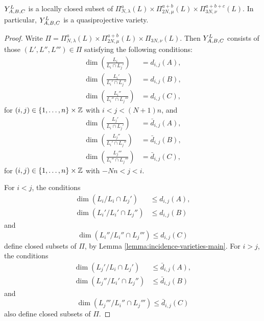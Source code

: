 \documentclass[a4paper, 11pt]{report}
\begin{document}
\begin{lemma}\label{lemma:y-triple-is-quasiprojective}
$\yprod[L]{A,B,C}$ is a locally closed subset of $\Pi_{N,\lambda}^a(L)\times\Pi_{2N,\mu}^{a+b}(L)\times\Pi_{3N,\nu}^{a+b+c}(L)$. In particular, $\yprod[L]{A,B,C}$ is a quasiprojective variety.
\end{lemma}

\begin{proof}
Write $\Pi=\Pi_{N,\lambda}^a(L)\times\Pi_{2N,\mu}^{a+b}(L)\times\Pi_{3N,\nu}(L)$. Then $\yprod[L]{A,B,C}$ consists of those $(L',L'',L''')\in\Pi$ satisfying the following conditions:
\begin{align}
\dim\left(\frac{L_i}{L_i\cap L_j'}\right) &= d_{i,j}{(A)},\\
\dim\left(\frac{L_i'}{L_i'\cap L_j''}\right) &= d_{i,j}{(B)},\\
\dim\left(\frac{L_i''}{L_i''\cap L_j'''}\right) &= d_{i,j}{(C)},
\end{align}
for $(i,j)\in \{1,\ldots,n\}\times\integers$ with $i<j<(N+1)n$, and
\begin{align}
\dim\left(\frac{L_j'}{L_i\cap L_j'}\right) &= \bar{d}_{i,j}{(A)},\\
\dim\left(\frac{L_j''}{L_i'\cap L_j''}\right) &= \bar{d}_{i,j}{(B)},\\
\dim\left(\frac{L_j'''}{L_i''\cap L_j'''}\right) &= \bar{d}_{i,j}{(C)},
\end{align}
for $(i,j)\in \{1,\ldots,n\}\times\integers$ with $-Nn<j<i$.

For $i<j$, the conditions
\begin{align*}
\dim\left(L_i/{L_i\cap L_j'}\right)&\le d_{i,j}{(A)},\\
\dim\left(L_i'/{L_i'\cap L_j''}\right)&\le d_{i,j}{(B)}
\end{align*}
and
\begin{equation*} 
\dim\left(L_i''/{L_i''\cap L_j'''}\right)\le d_{i,j}{(C)}
\end{equation*}
define closed subsets of $\Pi$, by Lemma \ref{lemma:incidence-varieties-main}. For $i>j$, the conditions
\begin{align*}
\dim\left(L_j'/{L_i\cap L_j'}\right)&\le \bar{d}_{i,j}{(A)},\\
\dim\left(L_j''/{L_i'\cap L_j''}\right)&\le \bar{d}_{i,j}{(B)}
\end{align*}
and
\begin{equation*}
\dim\left(L_j'''/{L_i''\cap L_j'''}\right)\le \bar{d}_{i,j}{(C)}
\end{equation*}
also define closed subsets of $\Pi$.


\end{proof}
\end{document}
